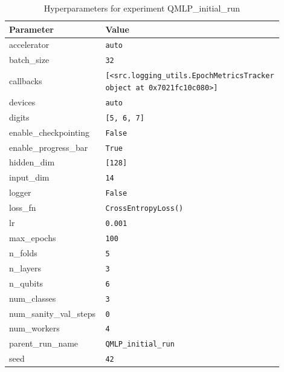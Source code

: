 \documentclass[runningheads]{llncs}
\begin{document}
\begin{table}[t]
\centering
\caption{Hyperparameters for experiment QMLP\_initial\_run}
\small
\setlength{\tabcolsep}{4pt}
\renewcommand{\arraystretch}{1.1}
\begin{tabular}{>{\RaggedRight\arraybackslash}p{0.35\linewidth}
                >{\RaggedRight\arraybackslash}p{0.55\linewidth}}
\hline
Parameter & Value \\
\hline
accelerator & \texttt{auto} \\
batch\_size & \texttt{32} \\
callbacks & \texttt{[<src.logging\_utils.EpochMetricsTracker object at 0x7021fc10c080>]} \\
devices & \texttt{auto} \\
digits & \texttt{[5, 6, 7]} \\
enable\_checkpointing & \texttt{False} \\
enable\_progress\_bar & \texttt{True} \\
hidden\_dim & \texttt{[128]} \\
input\_dim & \texttt{14} \\
logger & \texttt{False} \\
loss\_fn & \texttt{CrossEntropyLoss()} \\
lr & \texttt{0.001} \\
max\_epochs & \texttt{100} \\
n\_folds & \texttt{5} \\
n\_layers & \texttt{3} \\
n\_qubits & \texttt{6} \\
num\_classes & \texttt{3} \\
num\_sanity\_val\_steps & \texttt{0} \\
num\_workers & \texttt{4} \\
parent\_run\_name & \texttt{QMLP\_initial\_run} \\
seed & \texttt{42} \\
\hline
\end{tabular}
\end{table}
\end{document}
